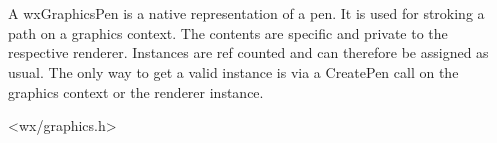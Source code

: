 
\section{}\label{wxgraphicspen}



A wxGraphicsPen is a native representation of a pen. It is used for stroking a path on a graphics context. The contents are specific and private to the respective renderer. Instances are ref counted and can therefore be assigned as usual. The only way to get a valid instance is via a CreatePen call on the graphics context or the renderer instance.


<wx/graphics.h>



